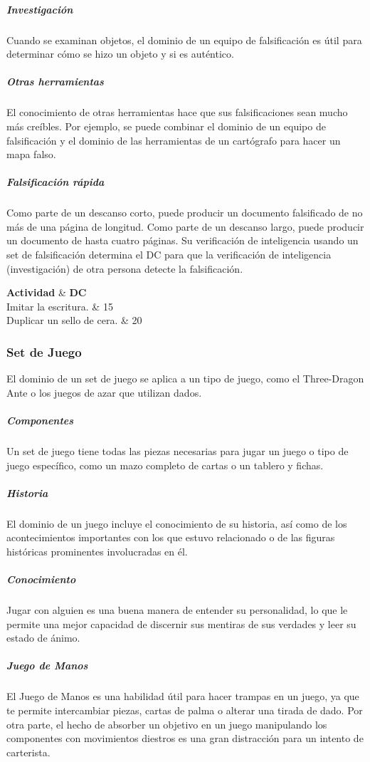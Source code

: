 \documentclass[a4paper,twocolumn,openany,10pt]{dndbook}
\begin{document}
\subparagraph{Investigación} Cuando se examinan objetos, el dominio de un equipo de falsificación es útil para determinar cómo se
hizo un objeto y si es auténtico.

\subparagraph{Otras herramientas} El conocimiento de otras herramientas hace que sus falsificaciones sean mucho más creíbles. Por
ejemplo, se puede combinar el dominio de un equipo de falsificación y el dominio de las herramientas de un cartógrafo para hacer
un mapa falso.

\subparagraph{Falsificación rápida} Como parte de un descanso corto, puede producir un documento falsificado de no más de una
página de longitud. Como parte de un descanso largo, puede producir un documento de hasta cuatro páginas. Su verificación de
inteligencia usando un set de falsificación determina el DC para que la verificación de inteligencia (investigación) de otra
persona detecte la falsificación.

\begin{dndtable}[Xc]
	\textbf{Actividad}				& \textbf{DC}	\\
	Imitar la escritura.			& 15	\\
	Duplicar un sello de cera.		& 20	\\
\end{dndtable}

\subsubsection*{Set de Juego}
El dominio de un set de juego se aplica a un tipo de juego, como el Three-Dragon Ante o los juegos de azar que utilizan dados.

\subparagraph{Componentes} Un set de juego tiene todas las piezas necesarias para jugar un juego o tipo de juego específico, como
un mazo completo de cartas o un tablero y fichas.

\subparagraph{Historia} El dominio de un juego incluye el conocimiento de su historia, así como de los acontecimientos importantes
con los que estuvo relacionado o de las figuras históricas prominentes involucradas en él.

\subparagraph{Conocimiento} Jugar con alguien es una buena manera de entender su personalidad, lo que le permite una mejor
capacidad de discernir sus mentiras de sus verdades y leer su estado de ánimo.

\subparagraph{Juego de Manos} El Juego de Manos es una habilidad útil para hacer trampas en un juego, ya que te permite
intercambiar piezas, cartas de palma o alterar una tirada de dado. Por otra parte, el hecho de absorber un objetivo en un juego
manipulando los componentes con movimientos diestros es una gran distracción para un intento de carterista. 
\end{document}
